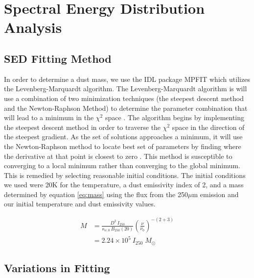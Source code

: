 \chapter{Spectral Energy Distribution Analysis}

\section{SED Fitting Method}

In order to determine a dust mass, we use the IDL package MPFIT \citep{markwardt2009} which utilizes the Levenberg-Marquardt algorithm.  The Levenberg-Marquardt algorithm is will use a combination of two minimization techniques (the steepest descent method and the Newton-Raphson Method) to determine the parameter combination that will lead to a minimum in the $\chi^2$ space \citep{burden2001}.  The algorithm begins by implementing the steepest descent method in order to traverse the $\chi^2$ space in the direction of the steepest gradient.  As the set of solutions approaches a minimum, it will use the Newton-Raphson method to locate best set of parameters by finding where the derivative at that point is closest to zero \citep{gavin2013}.  This method is susceptible to converging to a local minimum rather than converging to the global minimum.  This is remedied by selecting reasonable initial conditions.  The initial conditions we used were 20K for the temperature, a dust emissivity index of 2, and a mass determined by equation \ref{eq:mass} using the flux from the 250$\mu$m emission and our initial temperature and dust emissivity values.  

\begin{equation}\label{eq:mass}
  \begin{split}
    M & = \frac{D^2 \: I_{250}}{\kappa_{\nu,0} \:  B_{250}\left(20\right)} \left(\frac{\nu}{\nu_0} \right)^{-\left(2+3\right)} \\
      & = 2.24 \times 10^5 \: I_{250} \; M_\odot
  \end{split}
\end{equation}

\section{Variations in Fitting}